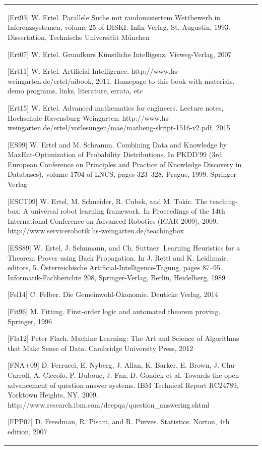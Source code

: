 \documentclass[10pt]{book}
\begin{document}
\begin{tabular}{|l|l|}
[Ert93] W. Ertel. Parallele Suche mit randomisiertem Wettbewerb in Inferenzsystemen, volume 25 of DISKI. Infix-Verlag, St. Augustin, 1993. Dissertation, Technische Universität München

[Ert07] W. Ertel. Grundkurs Künstliche Intelligenz. Vieweg-Verlag, 2007

[Ert11] W. Ertel. Artificial Intelligence. http://www.hs-weingarten.de/ertel/aibook, 2011. Homepage to this book with materials, demo programs, links, literature, errata, etc

[Ert15] W. Ertel. Advanced mathematics for engineers. Lecture notes, Hochschule Ravensburg-Weingarten: http://www.hs-weingarten.de/ertel/vorlesungen/mae/matheng-skript-1516-v2.pdf, 2015

[ES99] W. Ertel and M. Schramm. Combining Data and Knowledge by MaxEnt-Optimization of Probability Distributions. In PKDD'99 (3rd European Conference on Principles and Practice of Knowledge Discovery in Databases), volume 1704 of LNCS, pages 323–328, Prague, 1999. Springer Verlag

[ESCT09] W. Ertel, M. Schneider, R. Cubek, and M. Tokic. The teaching-box: A universal robot learning framework. In Proceedings of the 14th International Conference on Advanced Robotics (ICAR 2009), 2009. http://www.servicerobotik.hs-weingarten.de/teachingbox

[ESS89] W. Ertel, J. Schumann, and Ch. Suttner. Learning Heuristics for a Theorem Prover using Back Propagation. In J. Retti and K. Leidlmair, editors, 5. Österreichische Artificial-Intelligence-Tagung, pages 87–95. Informatik-Fachberichte 208, Springer-Verlag, Berlin, Heidelberg, 1989

[Fel14] C. Felber. Die Gemeinwohl-Ökonomie. Deuticke Verlag, 2014

[Fit96] M. Fitting. First-order logic and automated theorem proving. Springer, 1996

[Fla12] Peter Flach. Machine Learning: The Art and Science of Algorithms that Make Sense of Data. Cambridge University Press, 2012

[FNA+09] D. Ferrucci, E. Nyberg, J. Allan, K. Barker, E. Brown, J. Chu-Carroll, A. Ciccolo, P. Duboue, J. Fan, D. Gondek et al. Towards the open advancement of question answer systems. IBM Technical Report RC24789, Yorktown Heights, NY, 2009. http://www.research.ibm.com/deepqa/question\_answering.shtml

[FPP07] D. Freedman, R. Pisani, and R. Purves. Statistics. Norton, 4th edition, 2007


\end{tabular}
\end{document}
